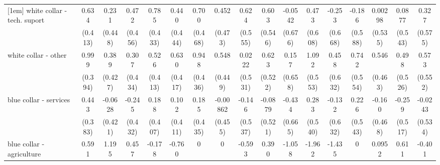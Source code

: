 {\begin{tabular}{l*{16}{c}}
[1em]
white collar - tech. suport&       0.634         &       0.231         &       0.472         &       0.785         &       0.440         &       0.700         &       0.452         &       0.624         &       0.603         &     -0.0542         &       0.473         &      -0.253         &      -0.186         &     0.00298         &      0.0877         &       0.327         \\
                    &     (0.413)         &     (0.448)         &     (0.456)         &     (0.433)         &     (0.444)         &     (0.468)         &     (0.473)         &     (0.555)         &     (0.546)         &     (0.676)         &     (0.608)         &     (0.668)         &     (0.588)         &     (0.535)         &     (0.543)         &     (0.575)         \\
[1em]
white collar - other&       0.999\sym{*}  &       0.389         &       0.307         &       0.526         &       0.630         &       0.948\sym{*}  &       0.548         &      0.0222         &       0.623         &       0.157         &       1.092\sym{*}  &       0.458         &       0.742         &       0.546         &       0.498         &       0.573         \\
                    &     (0.394)         &     (0.427)         &     (0.434)         &     (0.413)         &     (0.417)         &     (0.436)         &     (0.449)         &     (0.531)         &     (0.522)         &     (0.658)         &     (0.553)         &     (0.632)         &     (0.554)         &     (0.463)         &     (0.526)         &     (0.552)         \\
[1em]
blue collar - services&       0.443         &     -0.0628         &      -0.245         &       0.188         &       0.102         &       0.185         &    -0.00862         &      -0.146         &     -0.0879         &      -0.434         &       0.283         &      -0.132         &       0.226         &      -0.160         &      -0.259         &     -0.0243         \\
                    &     (0.383)         &     (0.421)         &     (0.432)         &     (0.407)         &     (0.411)         &     (0.435)         &     (0.455)         &     (0.537)         &     (0.521)         &     (0.665)         &     (0.540)         &     (0.632)         &     (0.543)         &     (0.468)         &     (0.517)         &     (0.534)         \\
[1em]
blue collar - agriculture&       0.591         &       1.195         &       0.457         &      -0.178         &      -0.760         &           0         &           0         &      -0.593         &       0.390         &      -1.058         &      -1.962         &      -1.435         &           0         &      0.0952         &       0.611         &      -0.401         \\

\end{tabular}}
